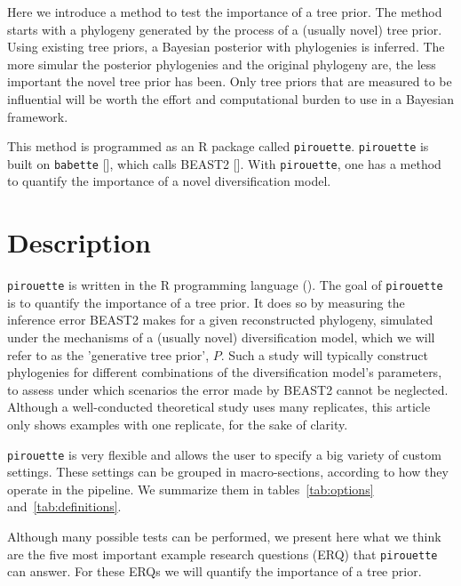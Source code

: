 \documentclass{article}
\begin{document}
Here we introduce a method to test the importance of a tree prior.
The method starts with a phylogeny generated by the process of 
a (usually novel) tree prior.
Using existing tree priors, a Bayesian posterior with phylogenies is inferred.
The more simular the posterior phylogenies 
and the original phylogeny are,
the less important the novel tree prior has been.
Only tree priors that are measured to be influential
will be worth the effort and computational burden 
to use in a Bayesian framework.

This method is programmed as an R package called \verb;pirouette;.
\verb;pirouette; is built on \verb;babette; [\cite{bilderbeek2018babette}], 
which calls BEAST2 [\cite{bouckaert2014beast}]. 
With \verb;pirouette;, one has a method to quantify the importance 
of a novel diversification model.

\section{Description}

\verb;pirouette; is written in the R programming language (\cite{R}).
The goal of \verb;pirouette; is to quantify the importance of a tree
prior. It does so by measuring the inference error BEAST2
makes for a given reconstructed phylogeny, 
simulated under the mechanisms of a (usually novel) diversification model, 
which we will refer to as the 'generative tree prior', $\mathit{P}$. 
Such a study will typically construct phylogenies 
for different combinations of the diversification model's parameters, 
to assess under which scenarios the error made by BEAST2 cannot be neglected. 
Although a well-conducted theoretical study uses many replicates, 
this article only shows examples with one replicate, for the sake of clarity.

\verb;pirouette; is very flexible and allows the user 
to specify a big variety of custom settings. 
These settings can be grouped in macro-sections, 
according to how they operate in the pipeline. 
We summarize them in tables~\ref{tab:options} and~\ref{tab:definitions}.

Although many possible tests can be performed, 
we present here what we think are the five most important 
example research questions (ERQ) that \verb;pirouette; can answer. 
For these ERQs we will quantify the importance of a tree prior.
\end{document}
